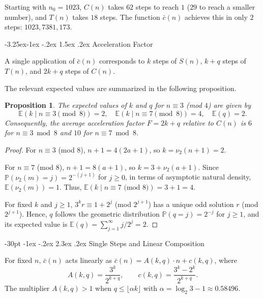 \documentclass[11pt]{article}
\makeatletter
\renewcommand\section{\@startsection {section}{1}{\z@}
{-30pt \@plus -1ex \@minus -.2ex}
{2.3ex \@plus.2ex}
{\normalfont\normalsize\bfseries\boldmath}}
\renewcommand\subsection{\@startsection{subsection}{2}{\z@}
{-3.25ex\@plus -1ex \@minus -.2ex}
{1.5ex \@plus .2ex}
{\normalfont\normalsize\bfseries\boldmath}}
\theoremstyle{plain}
\newtheorem{proposition}{Proposition}
\theoremstyle{definition}
\theoremstyle{remark}
\makeatother
\begin{document}
Starting with $n_0 = 1023$, $C(n)$ takes $62$ steps to reach $1$ ($29$ to reach a smaller number), and $T(n)$ takes $18$ steps. The function $\bar{c}(n)$ achieves this in only $2$ steps: $1023, 7381, 173$.

\subsection{Acceleration Factor}

A single application of $\bar{c}(n)$ corresponds to $k$ steps of $S(n)$, $k+q$ steps of $T(n)$, and $2k+q$ steps of $C(n)$.

The relevant expected values are summarized in the following proposition.
\begin{proposition}\label{prop:acceleration}
The expected values of $k$ and $q$ for $n \equiv 3$ (mod $4$) are given by
\begin{displaymath}
\mathbb{E}(k \mid n \equiv 3 \pmod  8) = 2, \quad \mathbb{E}(k \mid n \equiv 7 \pmod  8) = 4, \quad \mathbb{E}(q) = 2.
\end{displaymath}
Consequently, the average acceleration factor $F = 2k+q$ relative to $C(n)$ is $6$ for $n \equiv 3 \bmod  8$  and $10$ for $n \equiv 7 \bmod  8$.
\end{proposition}

\begin{proof}
For $n \equiv 3$ (mod $8$), $n+1 = 4(2a+1)$, so $k = \nu_2(n+1) = 2$. \par
For $n \equiv 7$ (mod $8$), $n+1 = 8(a+1)$, so $k = 3 + \nu_2(a+1)$. 
Since $\mathbb{P}(\nu_2(m) = j) = 2^{-(j+1)}$ for $j\ge 0$, in terms of asymptotic natural density, $\mathbb{E}(\nu_2(m)) = 1$. 
Thus, $\mathbb{E}(k \mid n \equiv 7 \text{ (mod } 8\text{)}) = 3 + 1 = 4$.

For fixed $k$ and $j \ge 1$, $3^k r \equiv 1 + 2^j$ (mod $2^{j+1}$) has a unique odd solution $r$ (mod $2^{j+1}$). 
Hence, $q$ follows the geometric distribution $\mathbb{P}(q = j) = 2^{-j}$ for $j \ge 1$, and its expected value is $\mathbb{E}(q) = \sum_{j=1}^{\infty} j / 2^j = 2$.
\end{proof}

\section{Single Steps and Linear Composition}

For fixed $n$, $\bar{c}(n)$ acts linearly as $\bar{c}(n) = A(k,q) \cdot n + c(k,q)$, where
\begin{displaymath}
A(k,q) = \frac{3^k}{2^{k+q}}, \qquad c(k,q) = \frac{3^k - 2^k}{2^{k+q}}.
\end{displaymath}
The multiplier $A(k,q) > 1$ when $q \le \lfloor \alpha k \rfloor$ with $\alpha = \log_2 3 - 1 \approx 0.58496$.
\end{document}
